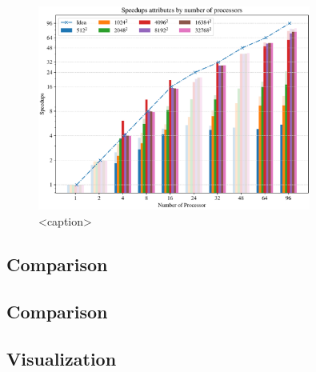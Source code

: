 \begin{figure}[htbp]
  \centering
  \includegraphics[width=0.8\textwidth]{figure/test_plot.pdf}
  \caption{<caption>}
  \label{<label>}
\end{figure}






\subsection{Comparison}
\subsection{Comparison}





\subsection{Visualization}